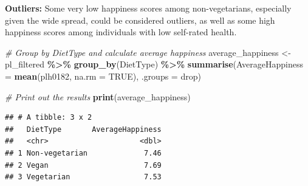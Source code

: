 \documentclass[
]{article}
\newenvironment{Shaded}{\begin{snugshade}}{\end{snugshade}}
\newcommand{\AttributeTok}[1]{\textcolor[rgb]{0.13,0.29,0.53}{#1}}
\newcommand{\CommentTok}[1]{\textcolor[rgb]{0.56,0.35,0.01}{\textit{#1}}}
\newcommand{\ConstantTok}[1]{\textcolor[rgb]{0.56,0.35,0.01}{#1}}
\newcommand{\FunctionTok}[1]{\textcolor[rgb]{0.13,0.29,0.53}{\textbf{#1}}}
\newcommand{\NormalTok}[1]{#1}
\newcommand{\OtherTok}[1]{\textcolor[rgb]{0.56,0.35,0.01}{#1}}
\newcommand{\SpecialCharTok}[1]{\textcolor[rgb]{0.81,0.36,0.00}{\textbf{#1}}}
\newcommand{\StringTok}[1]{\textcolor[rgb]{0.31,0.60,0.02}{#1}}
\begin{document}
\textbf{Outliers:} Some very low happiness scores among non-vegetarians,
especially given the wide spread, could be considered outliers, as well
as some high happiness scores among individuals with low self-rated
health.

\begin{Shaded}
\begin{Highlighting}[]
\CommentTok{\# Group by DietType and calculate average happiness}
\NormalTok{average\_happiness }\OtherTok{\textless{}{-}}\NormalTok{ pl\_filtered }\SpecialCharTok{\%\textgreater{}\%}
  \FunctionTok{group\_by}\NormalTok{(DietType) }\SpecialCharTok{\%\textgreater{}\%}
  \FunctionTok{summarise}\NormalTok{(}\AttributeTok{AverageHappiness =} \FunctionTok{mean}\NormalTok{(plh0182, }\AttributeTok{na.rm =} \ConstantTok{TRUE}\NormalTok{), }\AttributeTok{.groups =} \StringTok{\textquotesingle{}drop\textquotesingle{}}\NormalTok{)}

\CommentTok{\# Print out the results}
\FunctionTok{print}\NormalTok{(average\_happiness)}
\end{Highlighting}
\end{Shaded}

\begin{verbatim}
## # A tibble: 3 x 2
##   DietType       AverageHappiness
##   <chr>                     <dbl>
## 1 Non-vegetarian             7.46
## 2 Vegan                      7.69
## 3 Vegetarian                 7.53
\end{verbatim}
\end{document}
